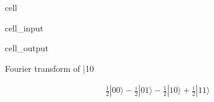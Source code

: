 \documentclass[letterpaper,10pt,english]{jupyterBook}
\begin{document}
\begin{sphinxuseclass}{cell}\begin{sphinxVerbatimInput}

\begin{sphinxuseclass}{cell_input}
\begin{sphinxVerbatim}[commandchars=\\\{\}]

\PYG{p}{[}\PYG{p}{]}
\end{sphinxVerbatim}

\end{sphinxuseclass}\end{sphinxVerbatimInput}
\begin{sphinxVerbatimOutput}

\begin{sphinxuseclass}{cell_output}
\begin{sphinxVerbatim}[commandchars=\\\{\}]
Fourier transform of |10\PYGZgt{}
\end{sphinxVerbatim}
\begin{equation*}
\begin{split}\frac{1}{2} |00\rangle- \frac{i}{2} |01\rangle- \frac{1}{2} |10\rangle+\frac{i}{2} |11\rangle\end{split}
\end{equation*}
\end{sphinxuseclass}\end{sphinxVerbatimOutput}

\end{sphinxuseclass}
\sphinxAtStartPar
{}
\end{document}
